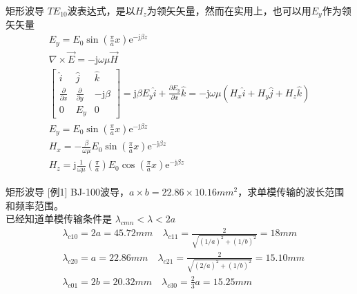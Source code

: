 \begin{frame}{矩形波导}
    $TE_{10}$波表达式，是以$H_z$为领矢矢量，然而在实用上，也可以用$E_y$作为领矢矢量
    \begin{gather*}
        E_y=E_0\sin\left(\frac{\pi}{a}x\right)\mathrm{e}^{-\mathrm{j}\beta z}\\
        \nabla\times\vec{E}=-\mathrm{j}\omega\mu\vec{H}\\
        \begin{bmatrix*}
            \hat{i} & \hat{j} & \hat{k}\\
            \frac{\partial}{\partial x} & \frac{\partial}{\partial y} & -\mathrm{j}\beta\\
            0 & E_y & 0
        \end{bmatrix*}
        =\mathrm{j}\beta E_y\hat{i}+\frac{\partial E_y}{\partial x}\hat{k}=-\mathrm{j}\omega\mu(H_x\hat{i}+H_y\hat{j}+H_z\hat{k})\\
        E_y = E_0\sin\left(\frac{\pi}{a}x\right)\mathrm{e}^{-\mathrm{j}\beta z}\\
        H_x = -\frac{\beta}{\omega\mu}E_0\sin\left(\frac{\pi}{a}x\right)\mathrm{e}^{-\mathrm{j}\beta z}\\
        H_z = \mathrm{j}\frac{1}{\omega\mu}\left(\frac{\pi}{a}\right)E_0\cos\left(\frac{\pi}{a}x\right)\mathrm{e}^{-\mathrm{j}\beta z}
    \end{gather*}
\end{frame}

\begin{frame}{矩形波导}
    [例1] BJ-100波导，$a\times b=22.86\times 10.16 mm^2$，求单模传输的波长范围和频率范围。\\
    \hspace*{\fill}
    \flushleft
    [解] 已经知道单模传输条件是 \quad $\lambda_{cmn}<\lambda<2a$ \\
    \begin{align*}
         & \lambda_{c10}=2a=45.72mm \quad \lambda_{c11}=\frac{2}{\sqrt{(1/a)^2+(1/b)^2}}=18mm    \\
         & \lambda_{c20}=a=22.86mm \quad  \lambda_{c21}=\frac{2}{\sqrt{(2/a)^2+(1/b)^2}}=15.10mm \\
         & \lambda_{c01}=2b=20.32mm \quad \lambda_{c30}=\frac{2}{3}a=15.25mm
    \end{align*}
\end{frame}

